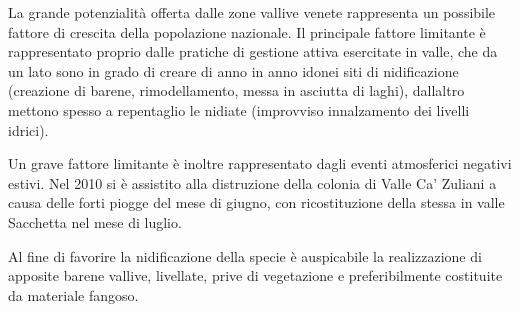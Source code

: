 La grande potenzialit\`a offerta dalle zone vallive venete rappresenta
un possibile fattore di crescita della popolazione nazionale. Il
principale fattore limitante \`e rappresentato proprio dalle pratiche
di gestione attiva esercitate in valle, che da un lato sono in grado di
creare di anno in anno idonei siti di nidificazione (creazione di
barene, rimodellamento, messa in asciutta di laghi),
dall{\textquotesingle}altro mettono spesso a repentaglio le nidiate
(improvviso innalzamento dei livelli idrici).

Un grave fattore limitante \`e inoltre rappresentato dagli eventi
atmosferici negativi estivi. Nel 2010 si \`e assistito alla distruzione
della colonia di Valle Ca{\textquoteright} Zuliani a causa delle forti
piogge del mese di giugno, con ricostituzione della stessa in valle
Sacchetta nel mese di luglio.

Al fine di favorire la nidificazione della specie \`e auspicabile la
realizzazione di apposite barene vallive, livellate, prive di
vegetazione e preferibilmente costituite da materiale fangoso.

\begin{table}[!h]
\centering
\caption{Numero di coppie nidificanti di pernice di mare nel delta del Po veneto}
\label{Verza_tab_1}
\end{table}


